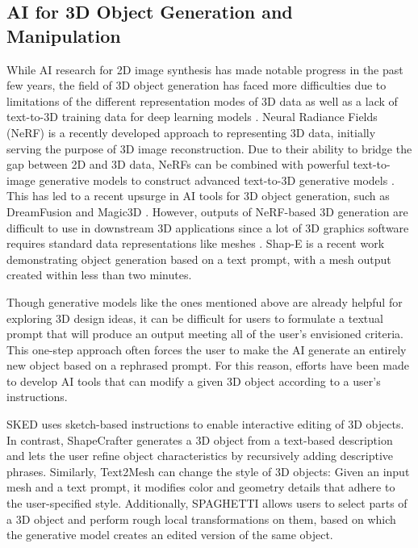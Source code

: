 \subsection{AI for 3D Object Generation and Manipulation}


While AI research for 2D image synthesis has made notable progress in the past few years, the field of 3D object generation has faced more difficulties due to limitations of the different representation modes of 3D data \cite{shi_deep_2023,li_generative_2023} as well as a lack of text-to-3D training data for deep learning models \cite{li_generative_2023}. Neural Radiance Fields (NeRF) \cite{mildenhall_nerf_2020} is a recently developed approach to representing 3D data, initially serving the purpose of 3D image reconstruction. Due to their ability to bridge the gap between 2D and 3D data, NeRFs can be combined with powerful text-to-image generative models to construct advanced text-to-3D generative models \cite{li_generative_2023}. This has led to a recent upsurge in AI tools for 3D object generation, such as DreamFusion \cite{poole_dreamfusion_2022} and Magic3D \cite{lin_magic3d_2023}. 
However, outputs of NeRF-based 3D generation are difficult to use in downstream 3D applications since a lot of 3D graphics software requires standard data representations like meshes \cite{li_generative_2023}. Shap-E \cite{jun_shap-e_2023} is a recent work demonstrating object generation based on a text prompt, with a mesh output created within less than two minutes.

Though generative models like the ones mentioned above are already helpful for exploring 3D design ideas, it can be difficult for users to formulate a textual prompt that will produce an output meeting all of the user's envisioned criteria. 
This one-step approach often forces the user to make the AI generate an entirely new object based on a rephrased prompt. 
For this reason, efforts have been made to develop AI tools that can modify a given 3D object according to a user's instructions.

SKED \cite{mikaeili_sked_2023} uses sketch-based instructions to enable interactive editing of 3D objects. 
In contrast, ShapeCrafter \cite{fu_shapecrafter_2023} generates a 3D object from a text-based description and lets the user refine object characteristics by recursively adding descriptive phrases.
Similarly, Text2Mesh \cite{michel_text2mesh_2021} can change the style of 3D objects: Given an input mesh and a text prompt, it modifies color and geometry details that adhere to the user-specified style. Additionally, SPAGHETTI \cite{hertz_spaghetti_2022} allows users to select parts of a 3D object and perform rough local transformations on them, based on which the generative model creates an edited version of the same object.

